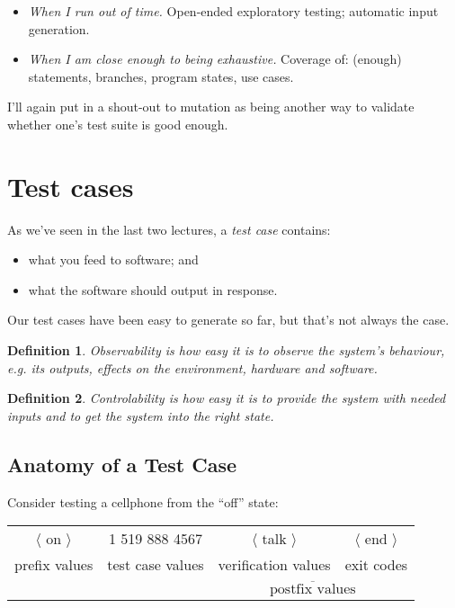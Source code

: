 \documentclass[11pt]{article}
\newtheorem{defn}{Definition}
\begin{document}
\begin{itemize}
\item \emph{When I run out of time.} Open-ended exploratory testing; automatic input generation.
\item \emph{When I am close enough to being exhaustive.} Coverage of: (enough) statements, branches, program states, use cases.
\end{itemize}

I'll again put in a shout-out to mutation as being another way to validate whether one's test
suite is good enough.

\newpage
\section*{Test cases}
As we've seen in the last two lectures, a \emph{test case} contains:
\begin{itemize}
\item what you feed to software; and
\item what the software should output in response.
\end{itemize}
Our test cases have been easy to generate so far, but that's not always the case.

\begin{defn}
\emph{Observability} is how easy it is to observe the system's behaviour, e.g.
its outputs, effects on the environment, hardware and software.
\end{defn}

\begin{defn}
\emph{Controlability} is how easy it is to provide the system with
needed inputs and to get the system into the right state.
\end{defn}

\subsection*{Anatomy of a Test Case}
Consider testing a cellphone from the ``off'' state:

\begin{center}
\begin{tabular}{cccc}
\Large $\langle$ on $\rangle$ & \Large 1 519 888 4567 & \Large $\langle$ talk $\rangle$ &
    \Large $\langle$ end $\rangle$ \\
\scriptsize prefix values & \scriptsize test case values & \scriptsize verification values & \scriptsize exit codes \\
&& \multicolumn{2}{c}{$\overline{\mbox{~~~~~postfix values~~~~~}}$}
\end{tabular}
\end{center}
\end{document}

